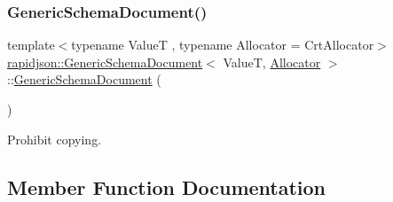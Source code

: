 \subsubsection{\texorpdfstring{GenericSchemaDocument()}{GenericSchemaDocument()}\hspace{0.1cm}{\footnotesize\ttfamily [2/2]}}
{\footnotesize\ttfamily template$<$typename ValueT , typename Allocator  = Crt\+Allocator$>$ \\
\mbox{\hyperlink{classrapidjson_1_1_generic_schema_document}{rapidjson\+::\+Generic\+Schema\+Document}}$<$ ValueT, \mbox{\hyperlink{classrapidjson_1_1_allocator}{Allocator}} $>$\+::\mbox{\hyperlink{classrapidjson_1_1_generic_schema_document}{Generic\+Schema\+Document}} (\begin{DoxyParamCaption}\item[{const \mbox{\hyperlink{classrapidjson_1_1_generic_schema_document}{Generic\+Schema\+Document}}$<$ ValueT, \mbox{\hyperlink{classrapidjson_1_1_allocator}{Allocator}} $>$ \&}]{ }\end{DoxyParamCaption})\hspace{0.3cm}{\ttfamily [private]}}



Prohibit copying. 



\subsection{Member Function Documentation}
\mbox{\label{classrapidjson_1_1_generic_schema_document_ab43d0cbe1c1c2512e9a38751ef7c7776}} 
